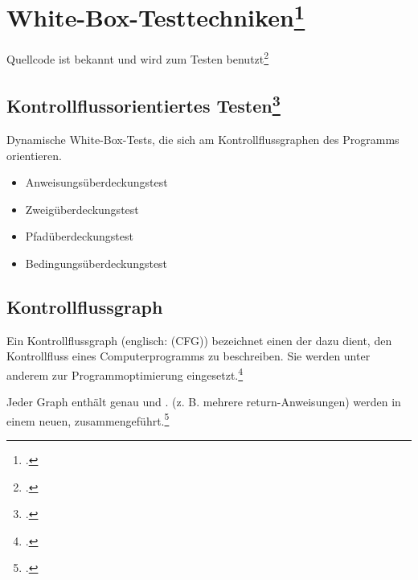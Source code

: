 \documentclass{lehramt-informatik-haupt}
\begin{document}
\section{White-Box-Testtechniken\footcite[Seite 199-246]{hoffmann:software}}

\begin{liQuellen}
\item \cite{wiki:white-box-test}
\item \cite[Seite 199-246]{hoffmann:software}
\end{liQuellen}

Quellcode ist bekannt und wird zum Testen benutzt\footcite[Seite
32]{sosy:fs:5}

%

\subsection{Kontrollflussorientiertes Testen\footcite[Seite 34]{sosy:fs:5}}

\begin{liQuellen}
\item \cite{wiki:kontrollfluss-test}
\item \cite[Kapitel 8.6.3 „Methoden zur Testfallermittlung“, Seite 251-252]{schneider}
\end{liQuellen}

Dynamische White-Box-Tests, die sich am Kontrollflussgraphen des
Programms orientieren.

\begin{itemize}
\item Anweisungsüberdeckungstest
\item Zweigüberdeckungstest
\item Pfadüberdeckungstest
\item Bedingungsüberdeckungstest
\end{itemize}

%

\subsection{Kontrollflussgraph}

Ein Kontrollflussgraph (englisch:  (CFG))
bezeichnet einen  der dazu dient, den
Kontrollfluss eines Computerprogramms zu beschreiben. Sie werden unter
anderem zur Programmoptimierung
eingesetzt.\footcite{wiki:kontrollflussgraph}

Jeder Graph enthält genau  und .  (z. B. mehrere
return-Anweisungen) werden in einem neuen,  zusammengeführt.\footcite[Seite
203]{hoffmann:software}
\end{document}
